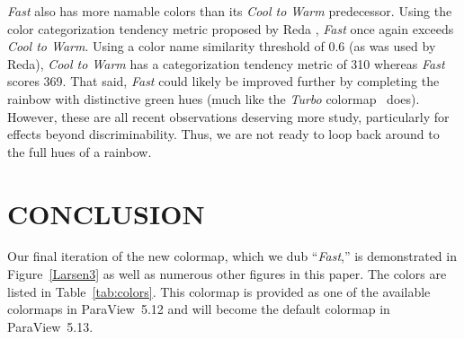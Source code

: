 \documentclass{IEEEcsmag}
\newcommand*{\colormap}[1]{\textsl{#1}\xspace}
\newcommand*{\coolwarm}{\colormap{Cool to Warm}}
\newcommand*{\fast}{\colormap{Fast}}
\newcommand*{\turbo}{\colormap{Turbo}}
\begin{document}
\fast also has more namable colors than its \coolwarm predecessor.
Using the color categorization tendency metric proposed by Reda \cite{Reda2022}, \fast once again exceeds \coolwarm.
Using a color name similarity threshold of 0.6 (as was used by Reda), \coolwarm has a categorization tendency metric of 310 whereas \fast scores 369.
That said, \fast could likely be improved further by completing the rainbow with distinctive green hues (much like the \turbo colormap~\cite{Mikhailov2019} does).
However, these are all recent observations deserving more study, particularly for effects beyond discriminability.
Thus, we are not ready to loop back around to the full hues of a rainbow.


\section{CONCLUSION}

Our final iteration of the new colormap, which we dub ``\fast,'' is demonstrated in Figure~\ref{Larsen3} as well as numerous other figures in this paper.
The colors are listed in Table~\ref{tab:colors}.
This colormap is provided as one of the available colormaps in ParaView~5.12 and will become the default colormap in ParaView~5.13.


\newcommand*{\colordemo}[1]{\colorbox{#1}{\phantom{X}}}
\end{document}
